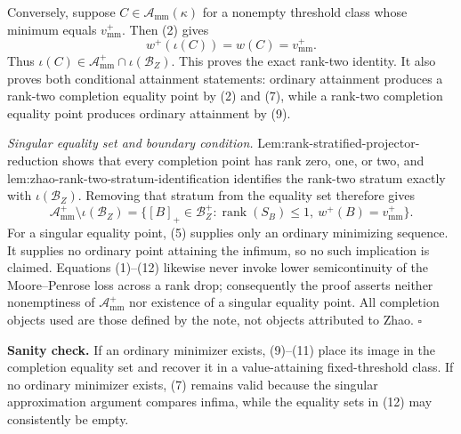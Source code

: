 Conversely, suppose \(C\in\mathcal A_{\mathrm{mm}}(\kappa)\) for a nonempty threshold class whose minimum equals \(v_{\mathrm{mm}}^+\).  Then (2) gives
\[
w^+(\iota(C))=w(C)=v_{\mathrm{mm}}^+.
\tag{11}
\]
Thus \(\iota(C)\in\mathcal A_{\mathrm{mm}}^+\cap\iota(\mathcal B_Z)\).  This proves the exact rank-two identity.  It also proves both conditional attainment statements: ordinary attainment produces a rank-two completion equality point by (2) and (7), while a rank-two completion equality point produces ordinary attainment by (9).

\emph{Singular equality set and boundary condition.}
Lem:rank-stratified-projector-reduction shows that every completion point has rank zero, one, or two, and lem:zhao-rank-two-stratum-identification identifies the rank-two stratum exactly with \(\iota(\mathcal B_Z)\).  Removing that stratum from the equality set therefore gives
\[
\mathcal A_{\mathrm{mm}}^+\setminus\iota(\mathcal B_Z)
=\{[B]_+\in\mathcal B_Z^+:\operatorname{rank}(S_B)\le1,\ w^+(B)=v_{\mathrm{mm}}^+\}.
\tag{12}
\]
For a singular equality point, (5) supplies only an ordinary minimizing sequence.  It supplies no ordinary point attaining the infimum, so no such implication is claimed.  Equations (1)--(12) likewise never invoke lower semicontinuity of the Moore--Penrose loss across a rank drop; consequently the proof asserts neither nonemptiness of \(\mathcal A_{\mathrm{mm}}^+\) nor existence of a singular equality point.  All completion objects used are those defined by the note, not objects attributed to Zhao. \(\square\)

\textbf{Sanity check.}
If an ordinary minimizer exists, (9)--(11) place its image in the completion equality set and recover it in a value-attaining fixed-threshold class.  If no ordinary minimizer exists, (7) remains valid because the singular approximation argument compares infima, while the equality sets in (12) may consistently be empty.